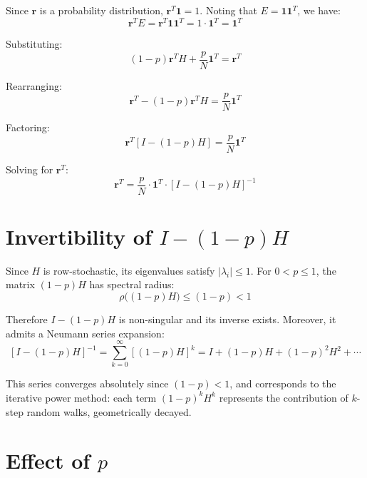 \documentclass{article}
\begin{document}
Since $\mathbf{r}$ is a probability distribution, $\mathbf{r}^T \mathbf{1} = 1$. Noting that $E = \mathbf{1}\mathbf{1}^T$, we have:
\begin{equation}
    \mathbf{r}^T E = \mathbf{r}^T \mathbf{1} \mathbf{1}^T = 1 \cdot \mathbf{1}^T = \mathbf{1}^T
\end{equation}

Substituting:
\begin{equation}
    (1 - p) \mathbf{r}^T H + \frac{p}{N} \mathbf{1}^T = \mathbf{r}^T
\end{equation}

Rearranging:
\begin{equation}
    \mathbf{r}^T - (1 - p) \mathbf{r}^T H = \frac{p}{N} \mathbf{1}^T
\end{equation}

Factoring:
\begin{equation}
    \mathbf{r}^T \left[ I - (1 - p) H \right] = \frac{p}{N} \mathbf{1}^T
\end{equation}

Solving for $\mathbf{r}^T$:
\begin{equation}
    \boxed{\mathbf{r}^T = \frac{p}{N} \cdot \mathbf{1}^T \cdot \left[ I - (1 - p) H \right]^{-1}}
\end{equation}

\section{Invertibility of $I - (1-p)H$}

Since $H$ is row-stochastic, its eigenvalues satisfy $|\lambda_i| \leq 1$. For $0 < p \leq 1$, the matrix $(1-p)H$ has spectral radius:
\begin{equation}
    \rho\big((1-p)H\big) \leq (1-p) < 1
\end{equation}

Therefore $I - (1-p)H$ is non-singular and its inverse exists. Moreover, it admits a Neumann series expansion:
\begin{equation}
    \left[ I - (1-p)H \right]^{-1} = \sum_{k=0}^{\infty} \left[(1-p)H\right]^k = I + (1-p)H + (1-p)^2 H^2 + \cdots
\end{equation}

This series converges absolutely since $(1-p) < 1$, and corresponds to the iterative power method: each term $(1-p)^k H^k$ represents the contribution of $k$-step random walks, geometrically decayed.

\section{Effect of $p$}
\end{document}
